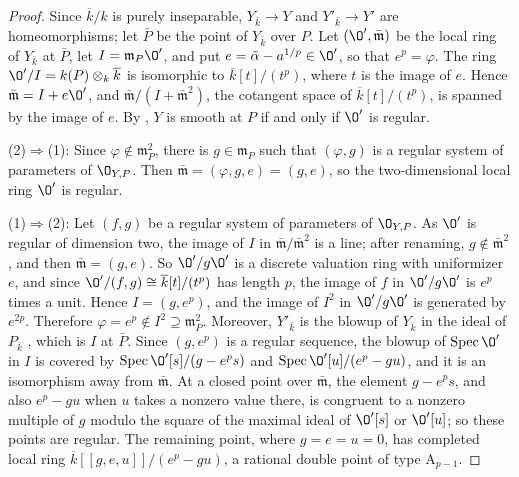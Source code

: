 \begin{proof}
Since $\overline k/k$ is purely inseparable, $Y_{\bar k}\to Y$ and $Y'_{\bar k}\to Y'$ are homeomorphisms; let $\bar P$ be the point of $Y_{\bar k}$ over $P$.
Let $(\O',\bar{\mathfrak m})$ be the local ring of $Y_{\bar k}$ at $\bar P$, let $I = \mathfrak m_P\O'$, and put $e = \tilde\alpha-a^{1/p}\in\O'$, so that $e^p = \varphi$.
The ring $\O'/I = k(P)\otimes_k\overline k$ is isomorphic to $\overline k[t]/(t^p)$, where $t$ is the image of $e$.
Hence $\bar{\mathfrak m} = I+e\O'$, and $\bar{\mathfrak m}/(I+\bar{\mathfrak m}^2)$, the cotangent space of $\overline k[t]/(t^p)$, is spanned by the image of $e$.
By \cite[Tags~ and~]{Stacks}, $Y$ is smooth at $P$ if and only if $\O'$ is regular.

(2)$\Rightarrow$(1): Since $\varphi\notin\mathfrak m_P^2$, there is $g\in\mathfrak m_P$ such that $(\varphi,g)$ is a regular system of parameters of $\O_{Y,P}$.
Then $\bar{\mathfrak m} = (\varphi,g,e) = (g,e)$, so the two-dimensional local ring $\O'$ is regular.

(1)$\Rightarrow$(2): Let $(f,g)$ be a regular system of parameters of $\O_{Y,P}$.
As $\O'$ is regular of dimension two, the image of $I$ in $\bar{\mathfrak m}/\bar{\mathfrak m}^2$ is a line; after renaming, $g\notin\bar{\mathfrak m}^2$, and then $\bar{\mathfrak m} = (g,e)$.
So $\O'/g\O'$ is a discrete valuation ring with uniformizer $e$, and since $\O'/(f,g)\cong\overline k[t]/(t^p)$ has length $p$, the image of $f$ in $\O'/g\O'$ is $e^p$ times a unit.
Hence $I = (g,e^p)$, and the image of $I^2$ in $\O'/g\O'$ is generated by $e^{2p}$.
Therefore $\varphi = e^p\notin I^2\supseteq\mathfrak m_P^2$.
Moreover, $Y'_{\bar k}$ is the blowup of $Y_{\bar k}$ in the ideal of $P_{\bar k}$ \cite[Tag~]{Stacks}, which is $I$ at $\bar P$.
Since $(g,e^p)$ is a regular sequence, the blowup of $\Spec\O'$ in $I$ is covered by $\Spec\O'[s]/(g-e^ps)$ and $\Spec\O'[u]/(e^p-gu)$, and it is an isomorphism away from $\bar{\mathfrak m}$.
At a closed point over $\bar{\mathfrak m}$, the element $g-e^ps$, and also $e^p-gu$ when $u$ takes a nonzero value there, is congruent to a nonzero multiple of $g$ modulo the square of the maximal ideal of $\O'[s]$ or $\O'[u]$; so these points are regular.
The remaining point, where $g = e = u = 0$, has completed local ring $\overline k[[g,e,u]]/(e^p-gu)$, a rational double point of type $\mathrm A_{p-1}$.


\end{proof}

